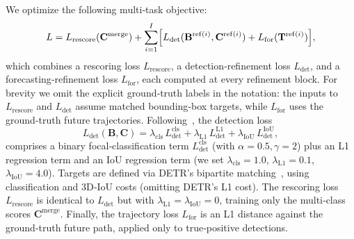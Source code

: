 We optimize the following multi‐task objective:
\[
  L = L_{\mathrm{rescore}}(\mathbf{C}^\mathrm{merge})
    + \sum_{i=1}^I \Bigl[
        L_{\mathrm{det}}(\mathbf{B}^{\mathrm{ref}(i)}, \mathbf{C}^{\mathrm{ref}(i)})
        + L_{\mathrm{for}}(\mathbf{T}^{\mathrm{ref}(i)})
      \Bigr],
\]
which combines a rescoring loss \(L_{\mathrm{rescore}}\), a detection‐refinement loss \(L_{\mathrm{det}}\), and a forecasting‐refinement loss \(L_{\mathrm{for}}\), each computed at every refinement block. For brevity we omit the explicit ground‐truth labels in the notation: the inputs to \(L_{\mathrm{rescore}}\) and \(L_{\mathrm{det}}\) assume matched bounding‐box targets, while \(L_{\mathrm{for}}\) uses the ground‐truth future trajectories. Following~\cite{casas2024detra}, the detection loss
\[
  L_{\mathrm{det}}(\mathbf{B},\mathbf{C})
    = \lambda_{\mathrm{cls}}\,L_{\mathrm{det}}^{\mathrm{cls}}
    + \lambda_{\mathrm{L1}}\,L_{\mathrm{det}}^{\mathrm{L1}}
    + \lambda_{\mathrm{IoU}}\,L_{\mathrm{det}}^{\mathrm{IoU}},
\]
comprises a binary focal‐classification term \(L_{\mathrm{det}}^{\mathrm{cls}}\) (with \(\alpha=0.5,\gamma=2\)) plus an L1 regression term and an IoU regression term (we set \(\lambda_{\mathrm{cls}}=1.0\), \(\lambda_{\mathrm{L1}}=0.1\), \(\lambda_{\mathrm{IoU}}=4.0\)). Targets are defined via DETR’s bipartite matching~\cite{carion2020end}, using classification and 3D‐IoU costs (omitting DETR’s L1 cost). The rescoring loss \(L_{\mathrm{rescore}}\) is identical to \(L_{\mathrm{det}}\) but with \(\lambda_{\mathrm{L1}}=\lambda_{\mathrm{IoU}}=0\), training only the multi‐class scores \(\mathbf{C}^\mathrm{merge}\). Finally, the trajectory loss \(L_{\mathrm{for}}\) is an L1 distance against the ground‐truth future path, applied only to true‐positive detections.
